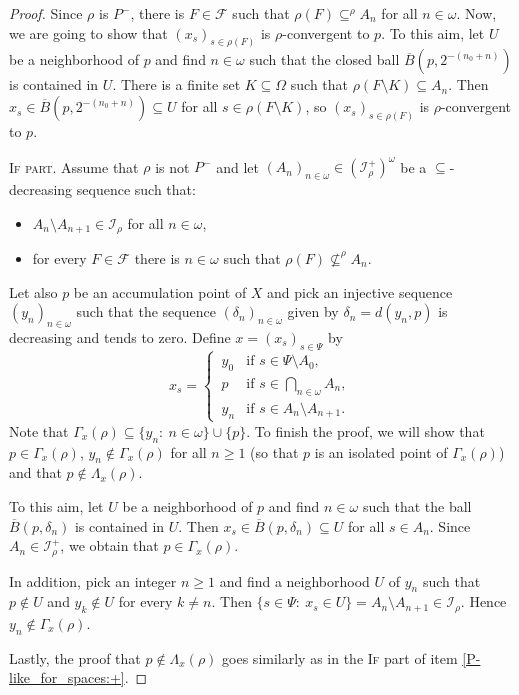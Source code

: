 \documentclass{amsart}
\theoremstyle{plain}
\theoremstyle{definition}
\theoremstyle{remark}
\newcommand{\cF}{\mathcal{F}}
\newcommand{\cI}{\mathcal{I}}
\newcommand{\I}{\cI}
\begin{document}
\begin{proof}
Since $\rho$ is $P^-$, there is $F\in\cF$ such that $\rho(F)\subseteq^\rho A_n$ for all $n\in\omega$. Now, we are going to show that $(x_s)_{s\in\rho(F)}$ is $\rho$-convergent to $p$. To this aim, let $U$ be a neighborhood of $p$ and find $n\in\omega$ such that the closed ball $\overline{B}(p,2^{-(n_0+n)})$ is contained in $U$. There is a finite set $K\subseteq\Omega$ such that $\rho(F\setminus K)\subseteq A_n$. Then $x_s\in \overline{B}(p,2^{-(n_0+n)})\subseteq U$ for all $s\in \rho(F\setminus K)$, so $(x_s)_{s\in\rho(F)}$ is $\rho$-convergent to $p$. 

\textsc{If part.}
Assume that $\rho$ is not $P^-$ and let $(A_n)_{n\in\omega}\in (\I_{\rho}^+)^\omega$ be a $\subseteq$-decreasing sequence such that:
\begin{itemize}
    \item $A_n\setminus A_{n+1}\in\I_\rho$ for all $n\in\omega$,
    \item for every $F\in\cF$ there is $n\in\omega$ such that $\rho(F)\not\subseteq^\rho A_n$.
\end{itemize}  
Let also $p$ be an accumulation point of $X$ and pick an injective sequence $(y_n)_{n\in\omega}$ such that the sequence $(\delta_n)_{n\in\omega}$ given by $\delta_n=d(y_n,p)$ is decreasing and tends to zero. Define $x=(x_s)_{s\in\Psi}$ by 
\begin{equation*}
x_{s}=\begin{cases}
    \,y_0 &\text{if }s\in\Psi\setminus A_0,\\
    \,p &\text{if }s\in\bigcap_{n\in\omega}A_n,\\
    \,y_n &\text{if }s\in A_n\setminus A_{n+1}.
\end{cases}
\end{equation*}
Note that $\Gamma_x(\rho)\subseteq\{y_n:\ n\in\omega\}\cup\{p\}$. To finish the proof, we will show that $p\in\Gamma_x(\rho)$, $y_n\notin\Gamma_x(\rho)$ for all $n\ge 1$ (so that $p$ is an isolated point of $\Gamma_x(\rho)$) and that $p\notin\Lambda_x(\rho)$.

To this aim, let $U$ be a neighborhood of $p$ and find $n\in\omega$ such that the ball $\overline{B}(p,\delta_n)$ is contained in $U$. Then $x_s\in \overline{B}(p,\delta_n)\subseteq U$ for all $s\in A_n$. Since $A_n\in\I_\rho^+$, we obtain that $p\in\Gamma_x(\rho)$.

In addition, pick an integer $n\ge 1$ and 
find a neighborhood $U$ of $y_n$ such that $p\notin U$ and $y_k\notin U$ for every $k\neq n$. Then $\{s\in\Psi:\ x_s\in U\}=A_n\setminus A_{n+1}\in\I_\rho$. Hence $y_n\notin\Gamma_x(\rho)$. 

Lastly, the proof that $p\notin\Lambda_x(\rho)$ goes similarly as in the \textsc{If} part of item \ref{P-like_for_spaces:+}.
\end{proof}
\end{document}
